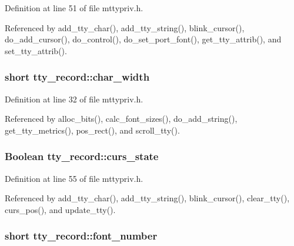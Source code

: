Definition at line 51 of file mttypriv.\+h.



Referenced by add\+\_\+tty\+\_\+char(), add\+\_\+tty\+\_\+string(), blink\+\_\+cursor(), do\+\_\+add\+\_\+cursor(), do\+\_\+control(), do\+\_\+set\+\_\+port\+\_\+font(), get\+\_\+tty\+\_\+attrib(), and set\+\_\+tty\+\_\+attrib().

\hypertarget{structtty__record_a2c85d65343bb145a61dd70945019e42b}{
\subsubsection[{char\+\_\+width}]{\setlength{\rightskip}{0pt plus 5cm}short tty\+\_\+record\+::char\+\_\+width}}\label{structtty__record_a2c85d65343bb145a61dd70945019e42b}


Definition at line 32 of file mttypriv.\+h.



Referenced by alloc\+\_\+bits(), calc\+\_\+font\+\_\+sizes(), do\+\_\+add\+\_\+string(), get\+\_\+tty\+\_\+metrics(), pos\+\_\+rect(), and scroll\+\_\+tty().

\hypertarget{structtty__record_acacb69c42d33de982846359bcc476767}{
\subsubsection[{curs\+\_\+state}]{\setlength{\rightskip}{0pt plus 5cm}Boolean tty\+\_\+record\+::curs\+\_\+state}}\label{structtty__record_acacb69c42d33de982846359bcc476767}


Definition at line 55 of file mttypriv.\+h.



Referenced by add\+\_\+tty\+\_\+char(), add\+\_\+tty\+\_\+string(), blink\+\_\+cursor(), clear\+\_\+tty(), curs\+\_\+pos(), and update\+\_\+tty().

\hypertarget{structtty__record_a4ff99f974e680a360f9b2d8ac95947a4}{
\subsubsection[{font\+\_\+number}]{\setlength{\rightskip}{0pt plus 5cm}short tty\+\_\+record\+::font\+\_\+number}}\label{structtty__record_a4ff99f974e680a360f9b2d8ac95947a4}


